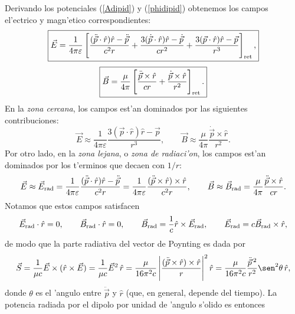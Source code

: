 Derivando los potenciales (\ref{Adipid}) y (\ref{phidipid}) obtenemos los campos el'ectrico y magn'etico correspondientes:
\begin{equation}
 \boxed{\vec{E}=\frac{1}{4\pi\varepsilon}\left[\frac{(\ddot{\vec{p}}\cdot\hat{r})\hat{r}-\ddot{\vec{p}}}{c^2r}+\frac{3(\dot{\vec{p}}\cdot\hat{r})\hat{r}-\dot{\vec{p}}}{cr^2}+\frac{3(\vec{p}\cdot\hat{r})\hat{r}-\vec{p}}{r^3}\right]_{\rm ret},}
\end{equation}
\begin{equation}
 \boxed{\vec{B}=\frac{\mu}{4\pi}\left[\frac{\ddot{\vec{p}}\times\hat{r}}{cr}+\frac{\dot{\vec{p}}\times\hat{r}}{r^2}\right]_{\rm ret}.}
\end{equation}
En la \textit{zona cercana}, los campos est'an dominados por las siguientes contribuciones:
\begin{equation}
 \vec{E}\approx\frac{1}{4\pi\varepsilon}\frac{3(\vec{p}\cdot\hat{r})\hat{r}-\vec{p}}{r^3},
\qquad
 \vec{B}\approx\frac{\mu}{4\pi}\frac{\dot{\vec{p}}\times\hat{r}}{r^2}.
\end{equation}
Por otro lado, en la \textit{zona lejana}, o \textit{zona de radiaci'on}, los campos est'an dominados por los t'erminos que decaen con $1/r$:
\begin{equation}
 \vec{E}\approx\vec{E}_{\rm rad}=\frac{1}{4\pi\varepsilon}\frac{(\ddot{\vec{p}}\cdot\hat{r})\hat{r}-\ddot{\vec{p}}}{c^2r}=\frac{1}{4\pi\varepsilon}\frac{(\ddot{\vec{p}}\times\hat{r})\times\hat{r}}{c^2r}, \qquad
 \vec{B}\approx \vec{B}_{\rm rad}=\frac{\mu}{4\pi}\frac{\ddot{\vec{p}}\times\hat{r}}{cr}.
\end{equation}
Notamos que estos campos satisfacen
\begin{equation}
 \vec{E}_{\rm rad}\cdot\hat{r}=0,\qquad  \vec{B}_{\rm rad}\cdot\hat{r}=0,\qquad \vec{B}_{\rm rad}=\frac{1}{c}\hat{r}\times\vec{E}_{\rm rad}, \qquad \vec{E}_{\rm rad}=c\vec{B}_{\rm rad}\times\hat{r},
\end{equation}
de modo que la parte radiativa del vector de Poynting es dada por
\begin{equation}
\vec{S}=\frac{1}{\mu c}\vec{E}\times(\hat{r}\times\vec{E}) 
=\frac{1}{\mu c}\vec{E}^2\,\hat{r}= \frac{\mu}{16\pi^2 c}\left|\frac{(\ddot{\vec{p}}\times\hat{r})\times\hat{r}}{r}\right|^2\hat{r} 
=\frac{\mu}{16\pi^2 c}\frac{\ddot{\vec{p}}{\,}^2}{r^2}\sen^2\theta\,\hat{r},
\end{equation}
donde $\theta$ es el 'angulo entre $\ddot{\vec{p}}$ y $\hat{r}$ (que, en general, depende del tiempo). La potencia radiada por el dipolo por unidad de 'angulo s'olido es entonces 
